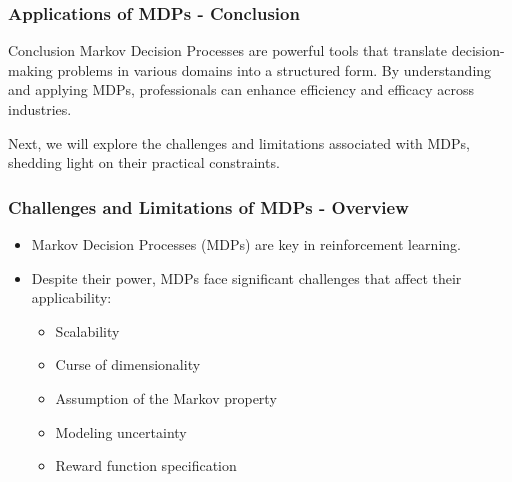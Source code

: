 \documentclass[aspectratio=169]{beamer}
\begin{document}
\begin{frame}[fragile]
    \frametitle{Applications of MDPs - Conclusion}
    \begin{block}{Conclusion}
        Markov Decision Processes are powerful tools that translate decision-making problems in various domains into a structured form. 
        By understanding and applying MDPs, professionals can enhance efficiency and efficacy across industries.
    \end{block}
    
    Next, we will explore the challenges and limitations associated with MDPs, shedding light on their practical constraints.
\end{frame}

\begin{frame}[fragile]
    \frametitle{Challenges and Limitations of MDPs - Overview}
    \begin{itemize}
        \item Markov Decision Processes (MDPs) are key in reinforcement learning.
        \item Despite their power, MDPs face significant challenges that affect their applicability:
        \begin{itemize}
            \item Scalability
            \item Curse of dimensionality
            \item Assumption of the Markov property
            \item Modeling uncertainty
            \item Reward function specification
        \end{itemize}
    \end{itemize}
\end{frame}
\end{document}
